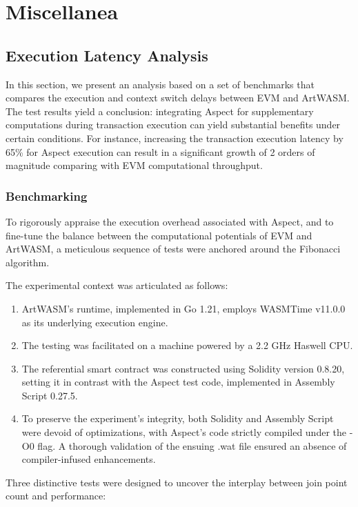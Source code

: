 \section{Miscellanea}

\subsection{Execution Latency Analysis}

In this section, we present an analysis based on a set of benchmarks that compares the execution and context switch delays between EVM and ArtWASM. The test results yield a conclusion: integrating Aspect for supplementary computations during transaction execution can yield substantial benefits under certain conditions. For instance, increasing the transaction execution latency by 65\% for Aspect execution can result in a significant growth of 2 orders of magnitude comparing with EVM computational throughput.

\subsubsection{Benchmarking}

To rigorously appraise the execution overhead associated with Aspect, and to fine-tune the balance between the computational potentials of EVM and ArtWASM, a meticulous sequence of tests were anchored around the Fibonacci algorithm.

The experimental context was articulated as follows:

\begin{enumerate}
  \item ArtWASM's runtime, implemented in Go 1.21, employs WASMTime v11.0.0 as its underlying execution engine.
  \item The testing was facilitated on a machine powered by a 2.2 GHz Haswell CPU.
  \item The referential smart contract was constructed using Solidity version 0.8.20, setting it in contrast with the Aspect test code, implemented in Assembly Script 0.27.5.
  \item To preserve the experiment's integrity, both Solidity and Assembly Script were devoid of optimizations, with Aspect's code strictly compiled under the -O0 flag. A thorough validation of the ensuing .wat file ensured an absence of compiler-infused enhancements.
\end{enumerate}

Three distinctive tests were designed to uncover the interplay between join point count and performance:

